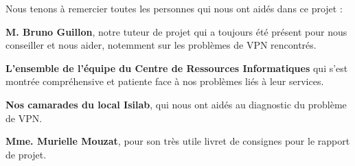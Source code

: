 Nous tenons à remercier toutes les personnes qui nous ont aidés dans ce projet :

\vspace{10pt}
\textbf{M. Bruno Guillon}, notre tuteur de projet qui a toujours été présent pour nous conseiller et nous aider, notemment sur les problèmes de VPN
rencontrés.

\vspace{10pt}
\textbf{L'ensemble de l'équipe du Centre de Ressources Informatiques} qui s'est montrée compréhensive et patiente face à nos problèmes liés à leur
services.

\vspace{10pt}
\textbf{Nos camarades du local Isilab}, qui nous ont aidés au diagnostic du problème de VPN.

\vspace{10pt}
\textbf{Mme. Murielle Mouzat}, pour son très utile livret de consignes pour le rapport de projet.